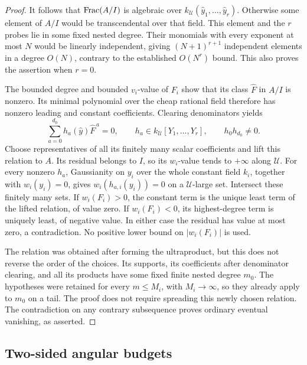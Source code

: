 \begin{proof}
It follows that $\operatorname{Frac}(A/I)$ is algebraic over
$k_{\mathcal U}(\widehat y_1,\ldots,\widehat y_r)$.
Otherwise some element of $A/I$ would be transcendental over that
field.  This element and the $r$ probes lie in some fixed nested
degree.  Their monomials with every exponent at most $N$ would be
linearly independent, giving $(N+1)^{r+1}$ independent elements in
a degree $O(N)$, contrary to the established $O(N^r)$ bound.
This also proves the assertion when $r=0$.

The bounded degree and bounded $v_i$-value of $F_i$ show that its
class $\widehat F$ in $A/I$ is nonzero.  Its minimal polynomial
over the cheap rational field therefore has nonzero leading and
constant coefficients.  Clearing denominators yields
\[
       \sum_{a=0}^{d_0}h_a(\widehat y)\widehat F^{\,a}=0,
 \qquad h_a\in k_{\mathcal U}[Y_1,\ldots,Y_r],
 \qquad h_0h_{d_0}\ne0.
\]
Choose representatives of all its finitely many scalar coefficients
and lift this relation to $A$.  Its residual belongs to $I$, so its
$w_i$-value tends to $+\infty$ along $\mathcal U$.
For every nonzero $h_a$, Gaussianity on $y_i$ over the whole
constant field $k_i$, together with $w_i(y_i)=0$, gives
$w_i(h_{a,i}(y_i))=0$ on a $\mathcal U$-large set.  Intersect
these finitely many sets.  If $w_i(F_i)>0$, the constant term is
the unique least term of the lifted relation, of value zero.  If
$w_i(F_i)<0$, its highest-degree term is uniquely least, of
negative value.  In either case the residual has value at most
zero, a contradiction.  No positive lower bound on
$|w_i(F_i)|$ is used.

The relation was obtained after forming the ultraproduct, but this
does not reverse the order of the choices.  Its supports, its
coefficients after denominator clearing, and all its products have
some fixed finite nested degree $m_0$.  The hypotheses were retained
for every $m\le M_i$, with $M_i\to\infty$, so they already apply
to $m_0$ on a tail.  The proof does not require spreading this newly
chosen relation.  The contradiction on any contrary subsequence
proves ordinary eventual vanishing, as asserted.
\end{proof}

\subsection{Two-sided angular budgets}

